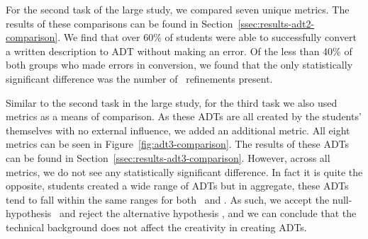 For the second task of the large study, we compared seven unique metrics. The results of these comparisons can be found in Section~\ref{ssec:results-adt2-comparison}. We find that over 60\% of students were able to successfully convert a written description to ADT without making an error. Of the less than 40\% of both groups who made errors in conversion, we found that the only statistically significant difference was the number of \OR\ refinements present.%



Similar to the second task in the large study, for the third task we also used metrics as a means of comparison. As these ADTs are all created by the students' themselves with no external influence, we added an additional metric. All eight metrics can be seen in Figure~\ref{fig:adt3-comparison}. The results of these ADTs can be found in Section~\ref{ssec:results-adt3-comparison}. However, across all metrics, we do not see any statistically significant difference. In fact it is quite the opposite, students created a wide range of ADTs but in aggregate, these ADTs tend to fall within the same ranges for both \ICS\ and \SEC. As such, we accept the null-hypothesis~\nullhypothesis{\hypoThirdADT} and reject the alternative hypothesis \althypothesis{\hypoThirdADT}, and we can conclude that the technical background does not affect the creativity in creating ADTs.




    

